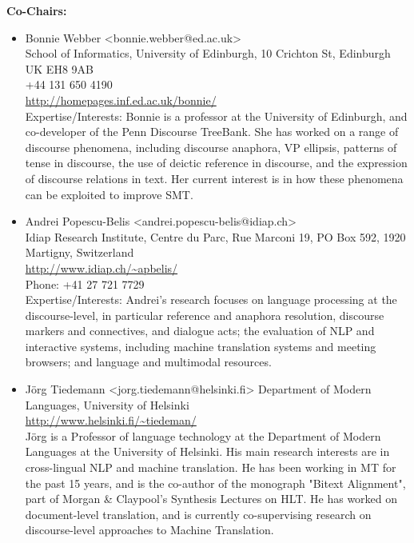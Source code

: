 \documentclass[11pt]{article}
\begin{document}
\textbf{Co-Chairs:}
\begin{itemize}
\item  Bonnie Webber <bonnie.webber@ed.ac.uk>\\
School of Informatics, University of Edinburgh, 10 Crichton St, Edinburgh UK EH8 9AB\\
+44 131 650 4190\\
\url{http://homepages.inf.ed.ac.uk/bonnie/}\\
Expertise/Interests: 
Bonnie is a professor at the University of Edinburgh, and co-developer
of the Penn Discourse TreeBank. She has worked on a range of discourse
phenomena, including discourse anaphora, VP ellipsis, patterns of tense in
discourse, the use of deictic reference in discourse, and the expression of
discourse relations in text. Her current interest is in how these phenomena
can be exploited to improve SMT.

\item  Andrei Popescu-Belis <andrei.popescu-belis@idiap.ch>\\
Idiap Research Institute, Centre du Parc, Rue Marconi 19, PO Box 592,
1920 Martigny, Switzerland\\
\url{http://www.idiap.ch/~apbelis/}\\
Phone: +41 27 721 7729\\
Expertise/Interests: Andrei's research focuses on language processing at the discourse-level, 
in particular reference and anaphora resolution, discourse markers and
connectives, and dialogue acts; the evaluation of NLP and interactive
systems, including machine translation systems and meeting browsers;
and language and multimodal resources.

\item  Jörg Tiedemann <jorg.tiedemann@helsinki.fi>
Department of Modern Languages, University of Helsinki\\
\url{http://www.helsinki.fi/~tiedeman/}\\
Jörg is a Professor of language technology at the Department of Modern Languages at the University of Helsinki. His main research interests are in cross-lingual NLP and machine translation.  He has been working in MT for the past 15
years, and is the co-author of the monograph "Bitext Alignment",  part
of Morgan \& Claypool's Synthesis Lectures on HLT.  He has worked on
document-level translation, and is currently co-supervising research
on discourse-level approaches to Machine Translation.
\end{itemize}
\end{document}
